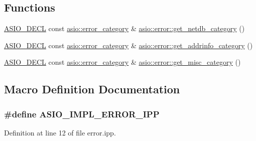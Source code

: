\subsection*{Functions}
\begin{DoxyCompactItemize}
\item 
\hyperlink{config_8hpp_ab54d01ea04afeb9a8b39cfac467656b7}{A\+S\+I\+O\+\_\+\+D\+E\+C\+L} const \hyperlink{classasio_1_1error__category}{asio\+::error\+\_\+category} \& \hyperlink{namespaceasio_1_1error_a1ac89eaed3a7078406f329068a71b8ba}{asio\+::error\+::get\+\_\+netdb\+\_\+category} ()
\item 
\hyperlink{config_8hpp_ab54d01ea04afeb9a8b39cfac467656b7}{A\+S\+I\+O\+\_\+\+D\+E\+C\+L} const \hyperlink{classasio_1_1error__category}{asio\+::error\+\_\+category} \& \hyperlink{namespaceasio_1_1error_a371cb8e6425ed58337e192fe35b4afe9}{asio\+::error\+::get\+\_\+addrinfo\+\_\+category} ()
\item 
\hyperlink{config_8hpp_ab54d01ea04afeb9a8b39cfac467656b7}{A\+S\+I\+O\+\_\+\+D\+E\+C\+L} const \hyperlink{classasio_1_1error__category}{asio\+::error\+\_\+category} \& \hyperlink{namespaceasio_1_1error_a57ab0c3eda415bc1d2c58f93875ff60f}{asio\+::error\+::get\+\_\+misc\+\_\+category} ()
\end{DoxyCompactItemize}


\subsection{Macro Definition Documentation}
\hypertarget{impl_2error_8ipp_a8d7ec220e0d9995e47546473c34052bf}{}
\subsubsection[{A\+S\+I\+O\+\_\+\+I\+M\+P\+L\+\_\+\+E\+R\+R\+O\+R\+\_\+\+I\+P\+P}]{\setlength{\rightskip}{0pt plus 5cm}\#define A\+S\+I\+O\+\_\+\+I\+M\+P\+L\+\_\+\+E\+R\+R\+O\+R\+\_\+\+I\+P\+P}\label{impl_2error_8ipp_a8d7ec220e0d9995e47546473c34052bf}


Definition at line 12 of file error.\+ipp.


